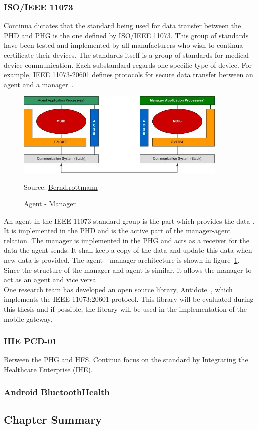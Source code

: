 \subsubsection{ISO/IEEE 11073}
\label{subsub:ieee11073}
	Continua dictates that the standard being used for data transfer between the PHD and PHG is the one defined by ISO/IEEE 11073. This group of standards have been tested and implemented by all manufacturers who wish to continua-certificate their devices. The standards itself is a group of standards for medical device communication. Each substandard regards one specific type of device. For example, IEEE 11073-20601 defines protocols for secure data transfer between an agent and a manager~\cite{hc_standards}.\\
\begin{figure}[]
	\centering
    	\includegraphics[width=0.9\textwidth]{Pictures/ISO_11073_Agent_Manager}
		\caption{Agent - Manager}
		Source: \href{https://commons.wikimedia.org/wiki/File:ISO_11073_Agent_Manager.jpg}{Bernd.rottmann}
	\label{fig:AgeMan}
\end{figure}
	An agent in the IEEE 11073 standard group is the part which provides the data \cite{wiki:11073}. It is implemented in the PHD and is the active part of the manager-agent relation. The manager is implemented in the PHG and acts as a receiver for the data the agent sends. It shall keep a copy of the data and update this data when new data is provided. The agent - manager architecture is shown in figure~\ref{fig:AgeMan}. Since the structure of the manager and agent is similar, it allows the manager to act as an agent and vice versa.\\
	One research team has developed an open source library, Antidote~\cite{11073Antidote}, which implements the IEEE 11073:20601 protocol. This library will be evaluated during this thesis and if possible, the library will be used in the implementation of the mobile gateway.

\subsubsection{IHE PCD-01}
\label{subsub:ihepcd01}
	Between the PHG and HFS, Continua focus on the standard by Integrating the Healthcare Enterprise (IHE).


\subsubsection{Android BluetoothHealth}
\label{subsub:bthealth}

\subsection{Chapter Summary}
\label{sub:backSum}
